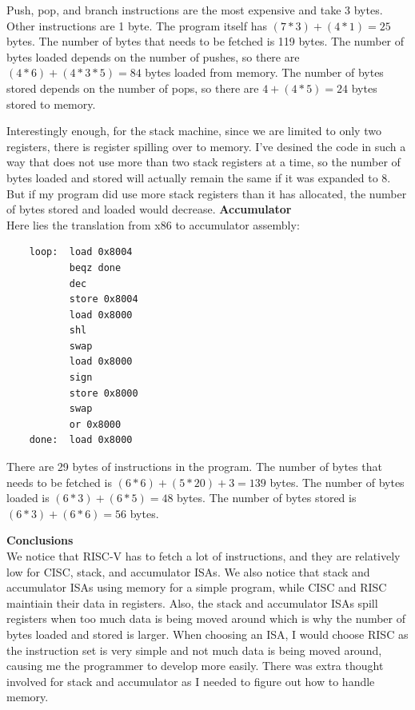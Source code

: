 \documentclass[11pt]{article}
\begin{document}
\begin{Parts}
	Push, pop, and branch instructions are the most expensive and take 3 bytes. Other instructions are 1 byte. The program itself has $(7 * 3) + (4 * 1) = 25$ bytes. The number of bytes that needs to be fetched is 119 bytes. The number of bytes loaded depends on the number of pushes, so there are $(4 * 6) + (4 * 3 * 5) = 84$ bytes loaded from memory. The number of bytes stored depends on the number of pops, so there are  $4 + (4 * 5) = 24$ bytes stored to memory.

	Interestingly enough, for the stack machine, since we are limited to only two registers, there is register spilling over to memory. I've desined the code in such a way that does not use more than two stack registers at a time, so the number of bytes loaded and stored will actually remain the same if it was expanded to 8. But if my program did use more stack registers than it has allocated, the number of bytes stored and loaded would decrease.
	\Part \textbf{Accumulator} \\
	Here lies the translation from x86 to accumulator assembly: \\
	\begin{lstlisting}
    loop:  load 0x8004
           beqz done
           dec
           store 0x8004
           load 0x8000
           shl
           swap
           load 0x8000
           sign
           store 0x8000
           swap
           or 0x8000
    done:  load 0x8000
    \end{lstlisting}

	There are 29 bytes of instructions in the program. The number of bytes that needs to be fetched is $(6 * 6) + (5 * 20) + 3 = 139$ bytes. The number of bytes loaded is $(6 * 3) + (6 * 5) = 48$ bytes. The number of bytes stored is $(6 * 3) + (6 * 6) = 56$ bytes.

	\Part \textbf{Conclusions} \\
	We notice that RISC-V has to fetch a lot of instructions, and they are relatively low for CISC, stack, and accumulator ISAs. We also notice that stack and accumulator ISAs using memory for a simple program, while CISC and RISC maintiain their data in registers. Also, the stack and accumulator ISAs spill registers when too much data is being moved around which is why the number of bytes loaded and stored is larger. When choosing an ISA, I would choose RISC as the instruction set is very simple and not much data is being moved around, causing me the programmer to develop more easily. There was extra thought involved for stack and accumulator as I needed to figure out how to handle memory.


\end{Parts}
\end{document}
